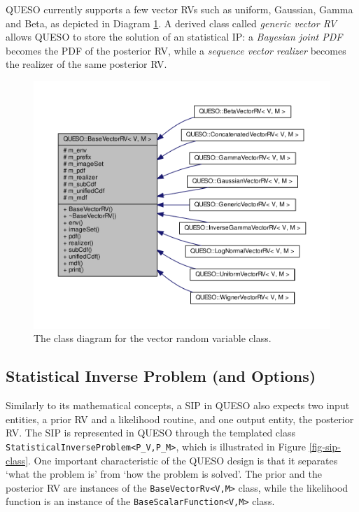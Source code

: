 QUESO currently supports a few vector RVs such as uniform, Gaussian, Gamma and Beta, as depicted in Diagram \ref{fig-vector-rv-class}.
A derived class called {\it generic vector RV} allows QUESO to store the solution of an statistical IP:
a {\it Bayesian joint PDF} becomes the PDF of the posterior RV, while a {\it sequence vector realizer} becomes the realizer of the same posterior RV.



\begin{figure}[htpb]
\centering
\includegraphics[scale=0.7,clip=true]{rawfigs/vector_rv}
\vspace{-1.cm}
\caption{The class diagram for the vector random variable class.}
\label{fig-vector-rv-class}
\end{figure}



\subsection{Statistical Inverse Problem (and Options)}
Similarly to its mathematical concepts, a SIP in QUESO also expects two input entities, a prior RV and a likelihood routine, and one output entity, the posterior RV.
The SIP is represented in QUESO through the templated class \verb+StatisticalInverseProblem<P_V,P_M>+, which is illustrated in Figure \ref{fig-sip-class}.
One important characteristic of the QUESO design is that it  separates `what the problem is' from `how the problem is solved'.
The prior and the posterior RV are instances of the \verb+BaseVectorRv<V,M>+ class, while
the likelihood function is an instance of the \verb+BaseScalarFunction<V,M>+ class.


